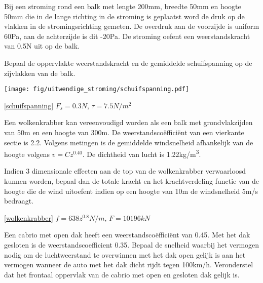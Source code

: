 \begin{toepassing}
	\label{schuifspanning}
Bij een stroming rond een balk met lengte 200mm, breedte 50mm en hoogte 50mm die in de lange richting in de stroming is geplaatst word de druk op de vlakken in de stromingsrichting gemeten. De overdruk aan de voorzijde is uniform 60Pa, aan de achterzijde is dit -20Pa. De stroming oefent een weerstandskracht van 0.5N uit op de balk.

Bepaal de oppervlakte weerstandskracht en de gemiddelde schuifspanning op de zijvlakken van de balk.

	\centering
	\texttt{[image: fig/uitwendige\_stroming/schuifspanning.pdf]}
\end{toepassing}
\begin{antwoord}{\ref{schuifspanning}}
	$F_s = 0.3N$, $\tau = 7.5N/m^2$
\end{antwoord}
\begin{toepassing}[*]
	\label{wolkenkrabber}
Een wolkenkrabber kan vereenvoudigd worden als een balk met grondvlakzijden van 50m en een hoogte van 300m. De weerstandscoëfficiënt van een vierkante sectie is 2.2. Volgens metingen is de gemiddelde windsnelheid afhankelijk van de hoogte volgens $v = C z^{0.40}$. De dichtheid van lucht is 1.22\unit{kg/m^3}.

Indien 3 dimensionale effecten aan de top van de wolkenkrabber verwaarloosd kunnen worden, bepaal dan de totale kracht en het krachtverdeling functie van de hoogte die de wind uitoefent indien op een hoogte van 10m de windsnelheid 5m/s bedraagt.
\end{toepassing}
\begin{antwoord}{\ref{wolkenkrabber}}
	$f = 638 z^{0.8} \unit{N/m}$, $F = 10196\unit{kN}$
\end{antwoord}
\begin{toepassing}
	\label{cabrio}
Een cabrio met open dak heeft een weerstandscoëfficiënt van 0.45. Met het dak gesloten is de weerstandscoefficient 0.35.
Bepaal de snelheid waarbij het vermogen nodig om de luchtweerstand te overwinnen met het dak open gelijk is aan het vermogen wanneer de auto met het dak dicht rijdt tegen 100\unit{km/h}. Veronderstel dat het frontaal oppervlak van de cabrio met open en gesloten dak gelijk is.
\end{toepassing}
